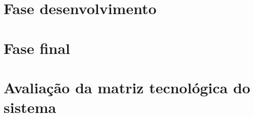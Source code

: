 \section{Fase desenvolvimento}
\label{sec:trldesen}

\section{Fase final}
\label{sec:trlconcl}

\section{Avaliação da matriz tecnológica do sistema}
\label{sec:avaltec}


